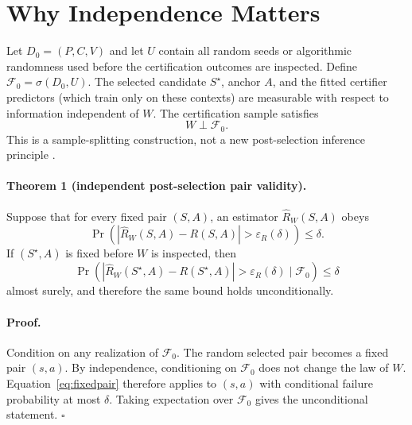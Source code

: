 \documentclass[10pt]{article}
\begin{document}
\section{Why Independence Matters}

Let $D_0=(P,C,V)$ and let $U$ contain all random seeds or algorithmic randomness used before the certification outcomes are inspected.
Define $\mathcal F_0=\sigma(D_0,U)$.
The selected candidate $S^\star$, anchor $A$, and the fitted certifier predictors (which train only on these contexts) are measurable with respect to information independent of $W$.
The certification sample satisfies
\begin{equation}
W\perp \mathcal F_0.
\end{equation}
This is a sample-splitting construction, not a new post-selection inference principle \citep{kuchibhotla2022postselection}.

\paragraph{Theorem 1 (independent post-selection pair validity).}
Suppose that for every fixed pair $(S,A)$, an estimator $\widehat R_W(S,A)$ obeys
\begin{equation}
\Pr\!\left(
\left|\widehat R_W(S,A)-R(S,A)\right|>\varepsilon_R(\delta)
\right)\le \delta.
\label{eq:fixedpair}
\end{equation}
If $(S^\star,A)$ is fixed before $W$ is inspected, then
\begin{equation}
\Pr\!\left(
\left|\widehat R_W(S^\star,A)-R(S^\star,A)\right|>\varepsilon_R(\delta)
\mid \mathcal F_0
\right)\le \delta
\end{equation}
almost surely, and therefore the same bound holds unconditionally.

\paragraph{Proof.}
Condition on any realization of $\mathcal F_0$.
The random selected pair becomes a fixed pair $(s,a)$.
By independence, conditioning on $\mathcal F_0$ does not change the law of $W$.
Equation~\eqref{eq:fixedpair} therefore applies to $(s,a)$ with conditional failure probability at most $\delta$.
Taking expectation over $\mathcal F_0$ gives the unconditional statement. $\square$
\end{document}
